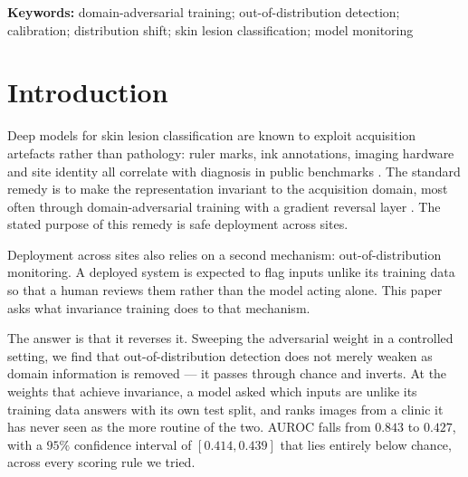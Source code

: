 \documentclass[11pt,a4paper]{article}
\begin{document}
\begin{abstract}
\noindent\textbf{Conclusions.} Across imaging modality, domain-adversarial training
does not merely weaken out-of-distribution monitoring; it reverses it, while every
routinely monitored metric improves. Between two hospitals sharing a modality the
collapse persists and the reversal does not, so the two should be claimed separately. OOD detection and out-of-domain calibration should
be reported as a function of achieved invariance rather than at a single
operating point.
\end{abstract}

\noindent\textbf{Keywords:} domain-adversarial training; out-of-distribution
detection; calibration; distribution shift; skin lesion classification;
model monitoring

\section{Introduction}

Deep models for skin lesion classification are known to exploit acquisition
artefacts rather than pathology: ruler marks, ink annotations, imaging
hardware and site identity all correlate with diagnosis in public benchmarks
\cite{winkler2019,bissoto2020,daneshjou2022}. The standard remedy is to make
the representation invariant to the acquisition domain, most often through
domain-adversarial training with a gradient reversal layer
\cite{ganin2016,bousmalis2016}. The stated purpose of this remedy is safe
deployment across sites.

Deployment across sites also relies on a second mechanism: out-of-distribution
monitoring. A deployed system is expected to flag inputs unlike its training
data so that a human reviews them rather than the model acting alone. This
paper asks what invariance training does to that mechanism.

The answer is that it reverses it. Sweeping the adversarial weight in a
controlled setting, we find that out-of-distribution detection does not merely
weaken as domain information is removed --- it passes through chance and
inverts. At the weights that achieve invariance, a model asked which inputs are
unlike its training data answers with its own test split, and ranks images from
a clinic it has never seen as the more routine of the two. AUROC falls from
$0.843$ to $0.427$, with a $95\%$ confidence interval of $[0.414, 0.439]$ that lies
entirely below chance, across every scoring rule we tried.
\end{document}
